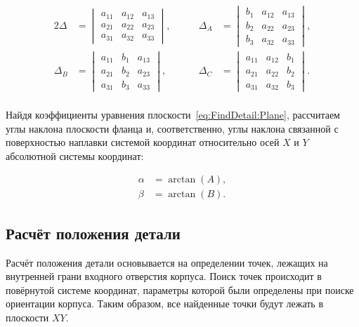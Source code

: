 \begin{alignat*}{2}
    \Delta &= \begin{vmatrix}
                  a_{11} & a_{12} & a_{13} \\
                  a_{21} & a_{22} & a_{23} \\
                  a_{31} & a_{32} & a_{33}
    \end{vmatrix}, & \qquad
    \Delta_A &= \begin{vmatrix}
                    b_1 & a_{12} & a_{13} \\
                    b_2 & a_{22} & a_{23} \\
                    b_3 & a_{32} & a_{33}
    \end{vmatrix}, \\
    \Delta_B &= \begin{vmatrix}
                    a_{11} & b_1 & a_{13} \\
                    a_{21} & b_2 & a_{23} \\
                    a_{31} & b_3 & a_{33}
    \end{vmatrix}, & \qquad
    \Delta_C &= \begin{vmatrix}
                    a_{11} & a_{12} & b_1 \\
                    a_{21} & a_{22} & b_2 \\
                    a_{31} & a_{32} & b_3
    \end{vmatrix}.
\end{alignat*} \\

Найдя коэффициенты уравнения плоскости~\ref{eq:FindDetail:Plane}, рассчитаем углы наклона плоскости фланца и, соответственно, углы наклона связанной с поверхностью наплавки системой координат относительно осей $X$ и $Y$ абсолютной системы координат:

\begin{align*}
    \alpha &= \arctan(A), \\
    \beta &= \arctan(B).
\end{align*}

\subsection{Расчёт положения детали} \label{subsec:DetailPosition}
Расчёт положения детали основывается на определении точек, лежащих на внутренней грани входного отверстия корпуса.
Поиск точек происходит в повёрнутой системе координат, параметры которой были определены при поиске ориентации корпуса.
Таким образом, все найденные точки будут лежать в плоскости $XY$.

